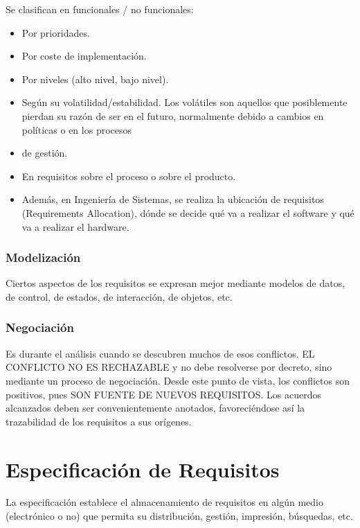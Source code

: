 Se clasifican en funcionales / no funcionales:
\begin{itemize}[noitemsep]
\item Por prioridades.
\item Por coste de implementación.
\item Por niveles (alto nivel, bajo nivel).
\item Según su volatilidad/estabilidad. Los volátiles son aquellos que
  posiblemente pierdan su razón de ser en el futuro, normalmente
  debido a cambios en políticas o en los procesos
\item de gestión.
\item En requisitos sobre el proceso o sobre el producto.
\item Además, en Ingeniería de Sistemas, se realiza la ubicación de
  requisitos (Requirements Allocation), dónde se decide qué va a
  realizar el software y qué va a realizar el hardware.
\end{itemize}

\subsubsection{Modelización}
\label{sec:requisitos:analisis:modelizacion}

Ciertos aspectos de los requisitos se expresan mejor mediante modelos
de datos, de control, de estados, de interacción, de objetos, etc.

\subsubsection{Negociación}
\label{sec:requisitos:analisis:negociacion}

Es durante el análisis cuando se descubren muchos de esos
conflictos. EL CONFLICTO NO ES RECHAZABLE y no debe resolverse por
decreto, sino mediante un proceso de negociación. Desde este punto de
vista, los conflictos son positivos, pues SON FUENTE DE NUEVOS
REQUISITOS. Los acuerdos alcanzados deben ser convenientemente
anotados, favoreciéndose así la trazabilidad de los requisitos a sus
orígenes.

\section{Especificación de Requisitos}
\label{sec:requisitos:especificacion}

La especificación establece el almacenamiento de requisitos en algún
medio (electrónico o no) que permita su distribución, gestión,
impresión, búsquedas, etc.

